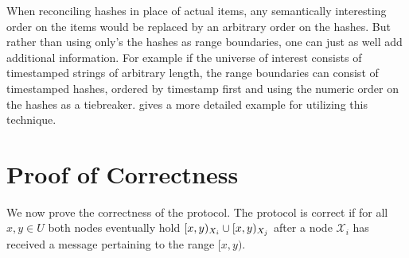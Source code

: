 When reconciling hashes in place of actual items, any semantically interesting order on the items would be replaced by an arbitrary order on the hashes. But rather than using only's the hashes as range boundaries, one can just as well add additional information. For example if the universe of interest consists of timestamped strings of arbitrary length, the range boundaries can consist of timestamped hashes, ordered by timestamp first and using the numeric order on the hashes as a tiebreaker.  gives a more detailed example for utilizing this technique.

\section{Proof of Correctness}
\label{set-reconciliation-simple-correct}

\newcommand{\intcount}[1]{\mathit{count}_{#1}}

We now prove the correctness of the protocol. The protocol is correct if for all $x, y \in U$ both nodes eventually hold $[{x},{y})_{X_i} \cup [{x},{y})_{X_j}$ after a node $\mathcal{X}_i$ has received a message pertaining to the range $[x, y)$.

